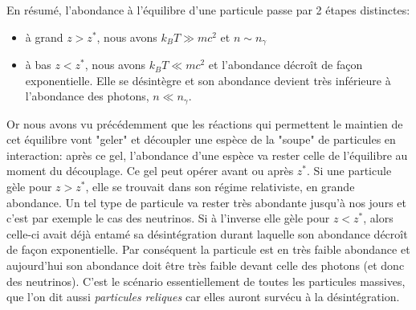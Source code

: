  
  En résumé, l'abondance à l'équilibre d'une particule passe par 2 étapes distinctes:
 \begin{itemize}
 \item à grand $z>z^*$, nous avons $k_B T \gg mc^2$ et $n\sim n_\gamma$
 \item à bas  $z<z^*$, nous avons $k_B T \ll mc^2$ et l'abondance décroît de façon exponentielle. Elle se désintègre et son abondance devient très inférieure à l'abondance des photons, $n\ll n_\gamma$.
 \end{itemize}
Or nous avons vu précédemment que les réactions qui permettent le maintien de cet équilibre vont "geler" et découpler une espèce de la "soupe" de particules en interaction: après ce gel, l'abondance d'une espèce va rester celle de l'équilibre au moment du découplage. Ce gel peut opérer avant ou après $z^*$. Si une particule gèle pour $z>z^*$, elle se trouvait dans son régime relativiste, en grande abondance. Un tel type de particule va rester très abondante jusqu'à nos jours et c'est par exemple le cas des neutrinos. Si à l'inverse elle gèle pour $z<z^*$, alors celle-ci avait déjà entamé sa désintégration durant laquelle son abondance décroît de façon exponentielle. Par conséquent la particule est en très faible abondance et aujourd'hui son abondance doit être très faible devant celle des photons (et donc des neutrinos). C'est le scénario essentiellement de toutes les particules massives, que l'on dit aussi \textit{particules reliques} car elles auront survécu à la désintégration.
 